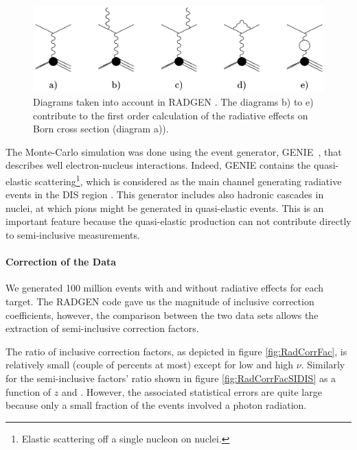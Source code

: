 \begin{figure}[htp]
\centering
\includegraphics[width=12cm] {chap5-fig/RadDiag.png}
\caption {Diagrams taken into account in RADGEN \cite{Akushevich:1998ft}. The 
diagrams b) to e) contribute to the first order calculation of the radiative 
effects on Born cross section (diagram a)).}
\label{fig:FDRadCorr}
\end{figure}

The Monte-Carlo simulation was done using the event generator, GENIE~\cite{Andreopoulos:2009rq}, that describes well electron-nucleus interactions. Indeed, GENIE contains the quasi-elastic scattering\footnote{Elastic 
scattering off a single nucleon on nuclei.}, which is considered as the main channel generating radiative events in the DIS region \cite{Akushevich:2007jc}. This generator includes also hadronic cascades in nuclei, at which pions might be generated in quasi-elastic events. This is an important feature because the quasi-elastic production can not contribute directly to semi-inclusive measurements.

\paragraph{Correction of the Data}

We generated 100 million events with and without radiative effects for each target. The RADGEN code gave us the magnitude of inclusive correction coefficients, however, the comparison between the two data sets allows the extraction of semi-inclusive correction factors.

The ratio of inclusive correction factors, as depicted in figure \ref{fig:RadCorrFac}, is relatively small (couple of percents at most) except for low \xb and high $\nu$. Similarly for the semi-inclusive factors' ratio shown in figure \ref{fig:RadCorrFacSIDIS} as a function of $z$ and \ptp. However, the associated statistical errors are quite large because only a small fraction of the events involved a photon radiation.

